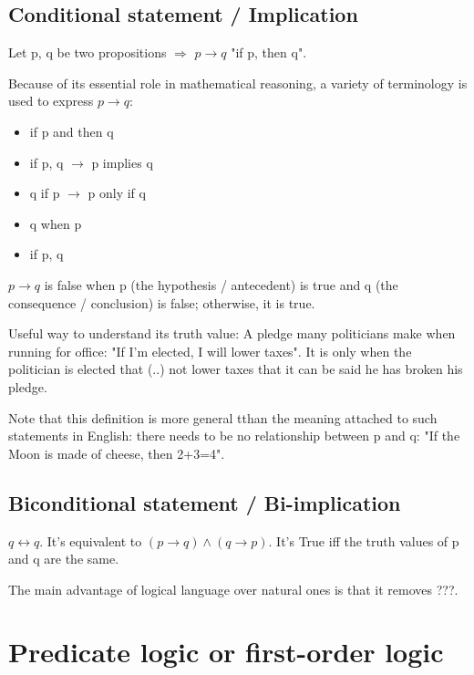 \documentclass[12pt, a4paper]{book}
\begin{document}
\subsection*{Conditional statement / Implication}

Let p, q be two propositions $\Rightarrow$ $p \rightarrow q $ "if p, then q".

Because of its essential role in mathematical reasoning, a variety of terminology is used to express $p \rightarrow q$:

\begin{itemize}
    \item if p and then q
    \item if p, q $\rightarrow$ p implies q
    \item q if p $\rightarrow$ p only if q
    \item q when p
    \item if p, q
\end{itemize}

$p \rightarrow q$ is false when p (the hypothesis / antecedent) is true and q (the consequence / conclusion) is false; otherwise, it is true.

Useful way to understand its truth value: A pledge many politicians make when running for office: "If I'm elected, I will lower taxes".
It is only when the politician is elected that (..) not lower taxes that it can be said he has broken his pledge.

\begin{rem}
    Note that this definition is more general tthan the meaning attached to such statements in English: there needs to be no relationship between p and q: "If the Moon is made of cheese, then 2+3=4".
\end{rem}

\subsection*{Biconditional statement / Bi-implication}

$q \leftrightarrow q$. It's equivalent to $(p \rightarrow q) \wedge (q \rightarrow p)$. It's True iff the truth 
values of p and q are the same.

The main advantage of logical language over natural ones is that it removes ???.

\section*{Predicate logic or first-order logic}
\end{document}
